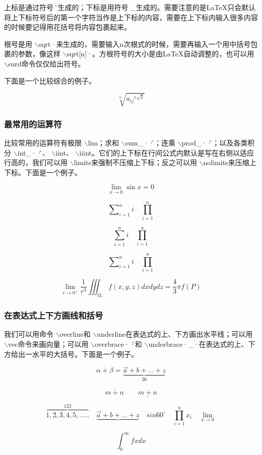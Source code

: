 \documentclass[UTF8]{ctexart}
\begin{document}
上标是通过符号 \^来生成的；下标是用符号 \_生成的。需要注意的是LaTeX只会默认将上下标符号后的第一个字符当作是上下标的内容，需要在上下标内输入很多内容的时候要记得用花括号将内容包裹起来。

根号是用 $\backslash$sqrt{·}来生成的，需要输入n次根式的时候，需要再输入一个用中括号包裹的参数，像这样 $\backslash$sqrt[n]{·}。方根符号的大小是由LaTeX自动调整的，也可以用 $\backslash$surd命令仅仅给出符号。

下面是一个比较综合的例子。


\[
\sqrt[n]{{a_{ij}}^{e\surd{2}}}
\]


\subsubsection{最常用的运算符}
比较常用的运算符有极限 $\backslash$lim；求和 $\backslash$sum\_{·}\^{·}；连乘 $\backslash$prod\_{·}\^{·}；以及各类积分 $\backslash$int\_{·}\^{·}、 $\backslash$iint、 $\backslash$iiint。它们的上下标在行间公式内默认是写在右侧以适应行高的，我们可以用 $\backslash$limits来强制不压缩上下标；反之可以用 $\backslash$nolimits来压缩上下标。下面是一个例子。

$$ 
\lim_{x \to 0}{\sin x}=0 
$$

\[
 \sum\nolimits_{i=1}^{n} i  \quad  \prod_{i=1}^n
\]

\[
\sum\limits_{i=1}^{n} i  \quad  \prod_{i=1}^n
\]

\[
\sum\nolimits_{i=1}^{n} i  \quad  \prod_{i=1}^n
\]

$$ \lim\limits_{r \to {0^{+}}}{\frac{1}{r^{3}}\iiint_{\Omega_{r}}f(x,y,z)dxdydz =\frac{4}{3}\pi f(P)}
$$

\subsubsection{在表达式上下方画线和括号}
我们可以用命令 $\backslash$overline和 $\backslash$underline在表达式的上、下方画出水平线；可以用 $\backslash$vec命令来画向量；可以用 $\backslash$overbrace{·}\^{·}和 $\backslash$underbrace{·}\_{·}在表达式的上、下方给出一水平的大括号。下面是一个例子。

\[
\overline{\alpha +\beta}=\underbrace{\vec{a}+b+...+z}_{26}
\]


\[ \overline{m +n} \qquad  \underline{m+n} \]


\[
\overbrace{1,2,3,4,5,.....}^{123}  \quad
\underbrace{\vec{a}+b+...+z} \quad
sin {60}^{\circ}   \quad
\prod_{i=1}^n x_i  \quad
\lim_{x \to 0}
\]


\[
\int_{0}^\infty{fxdx}
\]
\end{document}
